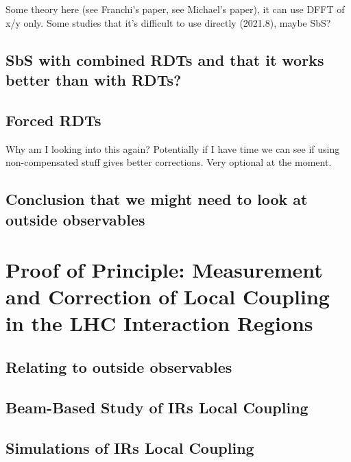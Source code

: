 Some theory here (see Franchi's paper, see Michael's paper), it can use DFFT of x/y only.
Some studies that it's difficult to use directly (2021.8), maybe SbS?

\subsection{SbS with combined RDTs and that it works better than with RDTs?}

\subsection{Forced RDTs}

Why am I looking into this again?
Potentially if I have time we can see if using non-compensated stuff gives better corrections.
Very optional at the moment.

\subsection{Conclusion that we might need to look at outside observables}


\section{Proof of Principle: Measurement and Correction of Local Coupling in the LHC Interaction Regions}

\subsection{Relating to outside observables}

\subsection{Beam-Based Study of IRs Local Coupling}

\subsection{Simulations of IRs Local Coupling}



